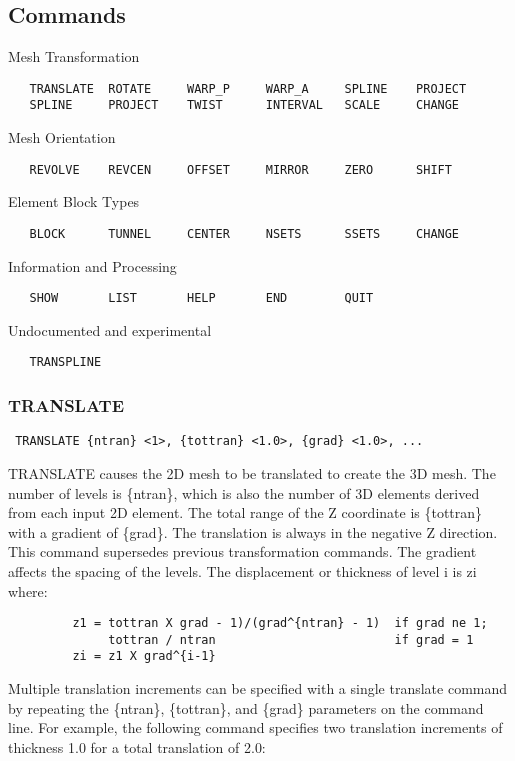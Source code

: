 \subsection{Commands}
Mesh Transformation
\begin{verbatim}
   TRANSLATE  ROTATE     WARP_P     WARP_A     SPLINE    PROJECT
   SPLINE     PROJECT    TWIST      INTERVAL   SCALE     CHANGE
\end{verbatim}

Mesh Orientation
\begin{verbatim}
   REVOLVE    REVCEN     OFFSET     MIRROR     ZERO      SHIFT
\end{verbatim}

Element Block Types
\begin{verbatim}
   BLOCK      TUNNEL     CENTER     NSETS      SSETS     CHANGE
\end{verbatim}

Information and Processing
\begin{verbatim}
   SHOW       LIST       HELP       END        QUIT
\end{verbatim}

Undocumented and experimental
\begin{verbatim}
   TRANSPLINE
\end{verbatim}
\subsubsection{TRANSLATE}
\begin{verbatim}
 TRANSLATE {ntran} <1>, {tottran} <1.0>, {grad} <1.0>, ...
\end{verbatim}

TRANSLATE causes the 2D mesh to be translated to create the 3D mesh.
The number of levels is \{ntran\}, which is also the number of 3D elements
derived from each input 2D element.  The total range of the Z coordinate
is \{tottran\} with a gradient of \{grad\}.  The translation is always in
the negative Z direction.  This command supersedes previous
transformation commands.
The gradient affects the spacing of the levels.  The displacement or
thickness of level i is zi where:
\begin{verbatim}
         z1 = tottran X grad - 1)/(grad^{ntran} - 1)  if grad ne 1;
              tottran / ntran                         if grad = 1
         zi = z1 X grad^{i-1}
\end{verbatim}
Multiple translation increments can be specified with a single translate
command by repeating the \{ntran\}, \{tottran\}, and \{grad\} parameters on
the command line.  For example, the following command specifies two
translation increments of thickness 1.0 for a total translation of 2.0:

